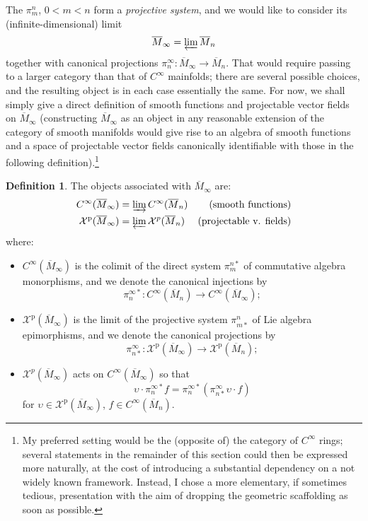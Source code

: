 \documentclass{article}
\def\XX{\mathcal{X}}
\def\p{\mathrm{p}}
\theoremstyle{definition}
\newtheorem{defn}{Definition}
\begin{document}
The $\pi^n_m$, $0 < m < n$ form a \emph{projective system},
and we would like to consider its (infinite-dimensional) limit $$\overline M_\infty = \varprojlim \overline M_n $$
together with
canonical projections $\pi^\infty_n : \overline M_\infty \to \overline M_n$. 
That would require passing to a larger category than that of $C^\infty$ mainfolds;
there are several possible choices, and the resulting object is in each case essentially the
same. 
For now, we shall simply give a direct definition of smooth functions and projectable vector fields
on $\overline M_\infty$
(constructing $\overline M_\infty$ as an object in any reasonable extension of the category of smooth manifolds
would give rise to an algebra of smooth functions and 
a space of projectable vector fields canonically identifiable with those in the following definition).\footnote{
        My preferred setting would be the (opposite of) the category of $C^\infty$ rings;
        several statements in the remainder of this section could then be expressed more naturally,
        at the cost of introducing a substantial dependency on a not widely known framework. Instead,
        I chose a more elementary, if sometimes tedious, presentation with the aim of dropping
        the geometric scaffolding as soon as possible.
}
\begin{defn}
        The objects associated with $\overline M_\infty$ are:
        \begin{align*}
                C^\infty(\overline M_\infty) &= \varinjlim C^\infty(\overline M_n) & \textrm{(smooth functions)} \\
                \XX^\p(\overline M_\infty) &= \varprojlim \XX^p(\overline M_n) & \textrm{(projectable v. fields)}
        \end{align*}
        where:
        \begin{itemize}
\item $C^\infty(\overline M_\infty)$ is the colimit of the direct system  $\pi^{n*}_m$ of 
        commutative algebra monorphisms, and we denote the canonical injections by
        $$\pi^{\infty*}_n : C^\infty(\overline M_n) \to C^\infty(\overline M_\infty);$$
\item $\XX^\p(\overline M_\infty)$ is the limit of the projective system $\pi^n_{m*}$ of
        Lie algebra epimorphisms, and we denote the canonical projections by
        $$ \pi^\infty_{n*}:\XX^\p(\overline M_\infty) \to \XX^\p(\overline M_n);$$
\item $\XX^p(\overline M_\infty)$ acts on $C^\infty(\overline M_\infty)$
        so that $$\upsilon\cdot \pi^{\infty*}_n f = \pi^{\infty*}_n (\pi^\infty_{n*}\upsilon\cdot f)$$
        for $\upsilon \in \XX^\p(\overline M_\infty)$, $f \in C^\infty(\overline M_n)$.
        \end{itemize}
\end{defn}
\end{document}
